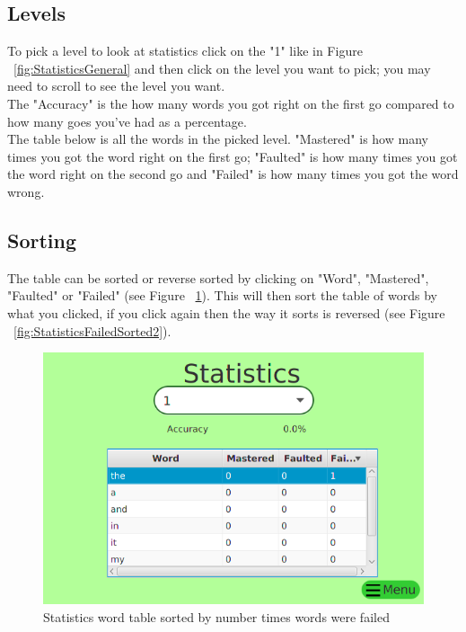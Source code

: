 \documentclass[12pt,a4paper,titlepage,onecolumn]{article}
\begin{document}
		\subsection{Levels}
		To pick a level to look at statistics click on the "1" like in Figure ~\ref{fig:StatisticsGeneral} and then click on the level you want to pick; you may need to scroll to see the level you want.\\ The "Accuracy" is the how many words you got right on the first go compared to how many goes you've had as a percentage. \\The table below is all the words in the picked level. "Mastered" is how many times you got the word right on the first go; "Faulted" is how many times you got the word right on the second go and "Failed" is how many times you got the word wrong.
		\subsection{Sorting}
		The table can be sorted or reverse sorted by clicking on "Word", "Mastered", "Faulted" or "Failed" (see Figure ~\ref{fig:StatisticsFailedSorted1}). This will then sort the table of words by what you clicked, if you click again then the way it sorts is reversed (see Figure ~\ref{fig:StatisticsFailedSorted2}).
		\begin{figure}[h]
			\centering
			\includegraphics[width=1\linewidth]{Figures/Statistics/StatisticsFailedSorted1}
			\caption[Sorted by Failed]{Statistics word table sorted by number times words were failed}
			\label{fig:StatisticsFailedSorted1}
		\end{figure}
\end{document}
